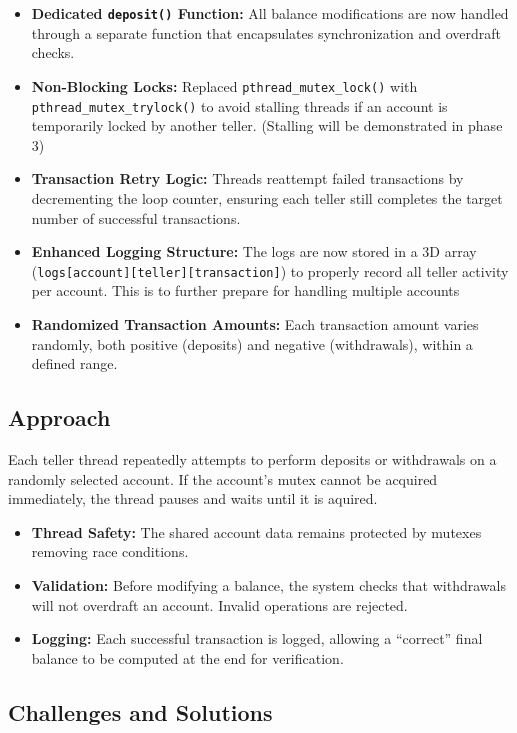 \documentclass[12pt]{article}
\begin{document}
\begin{itemize}
  \item \textbf{Dedicated \texttt{deposit()} Function:}
  All balance modifications are now handled through a separate function that encapsulates synchronization and overdraft checks.
  \item \textbf{Non-Blocking Locks:}
  Replaced \texttt{pthread\_mutex\_lock()} with \texttt{pthread\_mutex\_trylock()} to avoid stalling threads if an account is temporarily locked by another teller. (Stalling will be demonstrated in phase 3)
  \item \textbf{Transaction Retry Logic:}
  Threads reattempt failed transactions by decrementing the loop counter, ensuring each teller still completes the target number of successful transactions.
  \item \textbf{Enhanced Logging Structure:}
  The logs are now stored in a 3D array (\texttt{logs[account][teller][transaction]}) to properly record all teller activity per account. This is to further prepare for handling multiple accounts
  \item \textbf{Randomized Transaction Amounts:}
  Each transaction amount varies randomly, both positive (deposits) and negative (withdrawals), within a defined range.
\end{itemize}

\subsection{Approach}

Each teller thread repeatedly attempts to perform deposits or withdrawals on a randomly selected account.
If the account’s mutex cannot be acquired immediately, the thread pauses and waits until it is aquired.

\begin{itemize}
  \item \textbf{Thread Safety:}
  The shared account data remains protected by mutexes removing race conditions.
  \item \textbf{Validation:}
  Before modifying a balance, the system checks that withdrawals will not overdraft an account.
  Invalid operations are rejected.
  \item \textbf{Logging:}
  Each successful transaction is logged, allowing a “correct” final balance to be computed at the end for verification.
\end{itemize}

\subsection{Challenges and Solutions}
\end{document}
